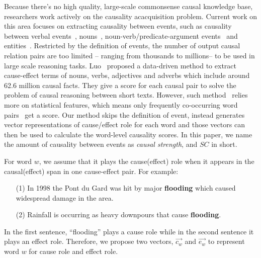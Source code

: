 Because there's no high quality, large-scale commonsense causal knowledge base, 
researchers work actively on the causality acacquisition problem. 
Current work on this area focuses on extracting causality between events, 
such as causality between verbal events~\cite{bethard2006identification,beamer2009using,riaz2010another,riaz2013toward}, nouns~\cite{girju2002mining,girju2003automatic}, noun-verb/predicate-argument events~\cite{riaz2014recognizing,hashimoto2014toward,zhao2017constructing} and entities~\cite{radinsky2012learning}.
Restricted by the definition of events, the number of output causal 
relation pairs are too limited -- ranging from thousands to millions-- 
to be used in large scale reasoning tasks. 
Luo~\cite{luo2016commonsense} proposed a data-driven method to 
extract cause-effect terms of nouns, verbs, adjectives and adverbs which 
include around 62.6 million causal facts. They give a score for 
each causal pair to solve the problem of causal reasoning between short texts. 
However, such method~\cite{luo2016commonsense,zhao2017constructing,gordon2011commonsense,roemmele2011choice} relies more on statistical features, 
which means only frequently 
co-occurring word pairs~\cite{zhao2017constructing} get a score. 
Our method skips the definition of event, instead generates 
vector representations of cause/effect role for each word and 
those vectors can then be used to calculate the word-level causality scores. 
In this paper, we name the amount of causality between events 
as \emph{causal strength}, and  $SC$ in short.

For word $w$, we assume that it plays the cause(effect) role 
when it appears in the causal(effect) span in one cause-effect pair. 
For example:
\begin{example}
\noindent
\label{eg:sen}
\begin{itemize}
	\item[(1)] In 1998 the Pont du Gard was hit by major \textbf{flooding} which caused widespread damage in the area.
	\item[(2)] Rainfall is occurring as heavy downpours that cause \textbf{flooding}.
\end{itemize}
\end{example}
In the first sentence, ``flooding'' plays a cause role while in the second sentence it plays an effect role. Therefore, we propose two vectors, $\overrightarrow{c_w}$ and $\overrightarrow{e_w}$ to represent word $w$ for cause role and effect role.

